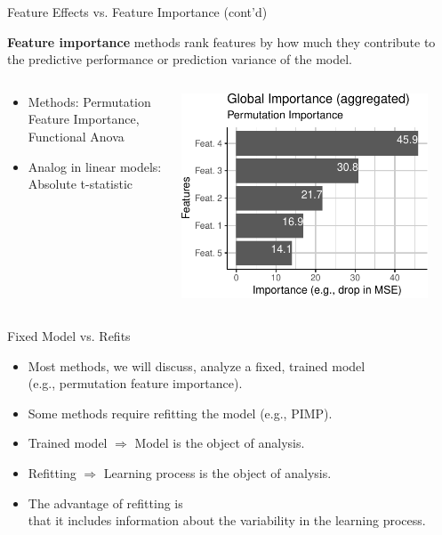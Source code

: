 \documentclass[aspectratio=169]{../latex_main/tntbeamer}  %
\begin{document}
\begin{frame}[c]{Feature Effects vs. Feature Importance (cont'd)}
	
	\textbf{Feature importance} methods rank features by how much they contribute to the predictive performance or prediction variance of the model.
	\begin{columns}
		\begin{column}{0.6\textwidth}
			\begin{itemize}
				\itemsep1em
				\item Methods: Permutation Feature Importance,\\ Functional Anova
				\item Analog in linear models: Absolute t-statistic %
			\end{itemize}
		\end{column}
		\begin{column}{0.4\textwidth}
			\begin{center}
				\includegraphics[page=1, width=0.9\textwidth]{figure/feature-importance}
			\end{center}
		\end{column}
	\end{columns}
\end{frame}



\begin{frame}[c]{Fixed Model vs. Refits}
	\begin{itemize}
		\itemsep1em
		\item Most methods, we will discuss, analyze a fixed, trained model\\ 
		(e.g., permutation feature importance).
		\item Some methods require refitting the model (e.g., PIMP).
		\item Trained model $\Rightarrow$ Model is the object of analysis.
		\item Refitting $\Rightarrow$ Learning process is the object of analysis.
		\item The advantage of refitting is\\ that it includes information about the variability in the learning process.
	\end{itemize}
\end{frame}

	
\end{document}
